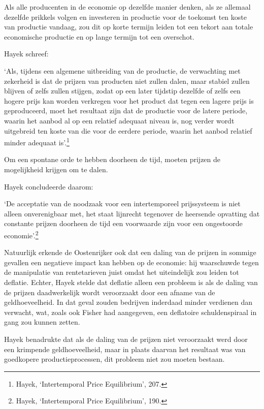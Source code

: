 \documentclass[
  a5paper,
  smalldemyvopaper,11pt,twoside,onecolumn,openright,extrafontsizes]{memoir}
\begin{document}
Als alle producenten in de economie op dezelfde manier denken, als ze
allemaal dezelfde prikkels volgen en investeren in productie voor de
toekomst ten koste van productie vandaag, zou dit op korte termijn
leiden tot een tekort aan totale economische productie en op lange
termijn tot een overschot.

Hayek schreef:

`Als, tijdens een algemene uitbreiding van de productie, de verwachting
met zekerheid is dat de prijzen van producten niet zullen dalen, maar
stabiel zullen blijven of zelfs zullen stijgen, zodat op een later
tijdstip dezelfde of zelfs een hogere prijs kan worden verkregen voor
het product dat tegen een lagere prijs is geproduceerd, moet het
resultaat zijn dat de productie voor de latere periode, waarin het
aanbod al op een relatief adequaat niveau is, nog verder wordt
uitgebreid ten koste van die voor de eerdere periode, waarin het aanbod
relatief minder adequaat is'.\footnote{\hspace{0pt}Hayek, `Intertemporal
  Price Equilibrium', 207.}

Om een spontane orde te hebben doorheen de tijd, moeten prijzen de
mogelijkheid krijgen om te dalen.

Hayek concludeerde daarom:

`De acceptatie van de noodzaak voor een intertemporeel prijssysteem is
niet alleen onverenigbaar met, het staat lijnrecht tegenover de
heersende opvatting dat constante prijzen doorheen de tijd een
voorwaarde zijn voor een ongestoorde economie'.\footnote{\hspace{0pt}Hayek,
  `Intertemporal Price Equilibrium', 190.}

Natuurlijk erkende de Oostenrijker ook dat een daling van de prijzen in
sommige gevallen een negatieve impact kan hebben op de economie: hij
waarschuwde tegen de manipulatie van rentetarieven juist omdat het
uiteindelijk zou leiden tot deflatie. Echter, Hayek stelde dat deflatie
alleen een probleem is als de daling van de prijzen daadwerkelijk wordt
veroorzaakt door een afname van de geldhoeveelheid. In dat geval zouden
bedrijven inderdaad minder verdienen dan verwacht, wat, zoals ook Fisher
had aangegeven, een deflatoire schuldenspiraal in gang zou kunnen
zetten.

Hayek benadrukte dat als de daling van de prijzen niet veroorzaakt werd
door een krimpende geldhoeveelheid, maar in plaats daarvan het resultaat
was van goedkopere productieprocessen, dit probleem niet zou moeten
bestaan.
\end{document}
